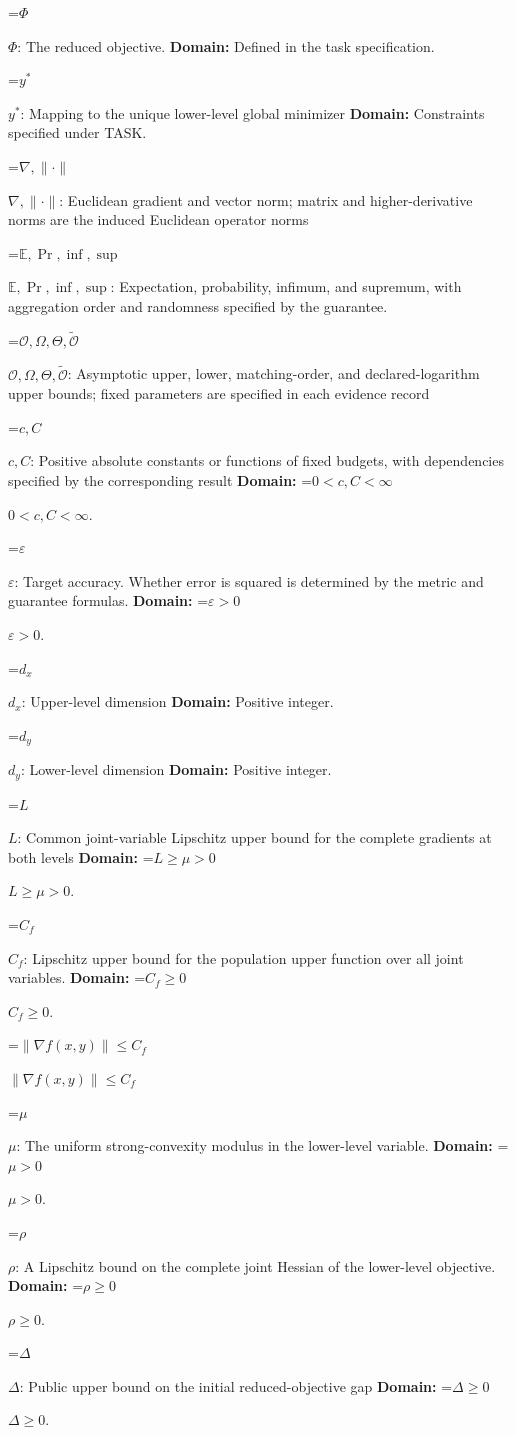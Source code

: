 \documentclass[10pt,a4paper]{article}
\newcommand{\AtlasMath}[1]{\par\begingroup\centering\setbox0=\hbox{$\displaystyle #1$}\ifdim\wd0>1.4\linewidth\typeout{ATLAS WIDE FORMULA: \the\wd0}\fi\ifdim\wd0>\linewidth\resizebox{\linewidth}{!}{\box0}\else\box0\fi\par\endgroup}
\newcommand{\AtlasInlineMath}[1]{\begingroup\setbox0=\hbox{$#1$}\ifdim\wd0>.4\linewidth\endgroup\AtlasMath{#1}\else\endgroup$#1$\fi}
\begin{document}
\AtlasInlineMath{\Phi}: The reduced objective. \textbf{Domain:} Defined in the task specification.

\AtlasInlineMath{y^*}: Mapping to the unique lower-level global minimizer \textbf{Domain:} Constraints specified under TASK.

\AtlasInlineMath{\nabla,\|\cdot\|}: Euclidean gradient and vector norm; matrix and higher-derivative norms are the induced Euclidean operator norms

\AtlasInlineMath{\mathbb E,\Pr,\inf,\sup}: Expectation, probability, infimum, and supremum, with aggregation order and randomness specified by the guarantee.

\AtlasInlineMath{\mathcal O,\Omega,\Theta,\widetilde{\mathcal O}}: Asymptotic upper, lower, matching-order, and declared-logarithm upper bounds; fixed parameters are specified in each evidence record

\AtlasInlineMath{c,C}: Positive absolute constants or functions of fixed budgets, with dependencies specified by the corresponding result \textbf{Domain:} \AtlasInlineMath{0<c,C<\infty}.

\AtlasInlineMath{\varepsilon}: Target accuracy. Whether error is squared is determined by the metric and guarantee formulas. \textbf{Domain:} \AtlasInlineMath{\varepsilon>0}.

\AtlasInlineMath{d_x}: Upper-level dimension \textbf{Domain:} Positive integer.

\AtlasInlineMath{d_y}: Lower-level dimension \textbf{Domain:} Positive integer.

\AtlasInlineMath{L}: Common joint-variable Lipschitz upper bound for the complete gradients at both levels \textbf{Domain:} \AtlasInlineMath{L\ge\mu>0}.

\AtlasInlineMath{C_f}: Lipschitz upper bound for the population upper function over all joint variables. \textbf{Domain:} \AtlasInlineMath{C_f\ge0}.

\AtlasInlineMath{\|\nabla f(x,y)\|\le C_f}

\AtlasInlineMath{\mu}: The uniform strong-convexity modulus in the lower-level variable. \textbf{Domain:} \AtlasInlineMath{\mu>0}.

\AtlasInlineMath{\rho}: A Lipschitz bound on the complete joint Hessian of the lower-level objective. \textbf{Domain:} \AtlasInlineMath{\rho\ge0}.

\AtlasInlineMath{\Delta}: Public upper bound on the initial reduced-objective gap \textbf{Domain:} \AtlasInlineMath{\Delta\ge0}.
\end{document}
